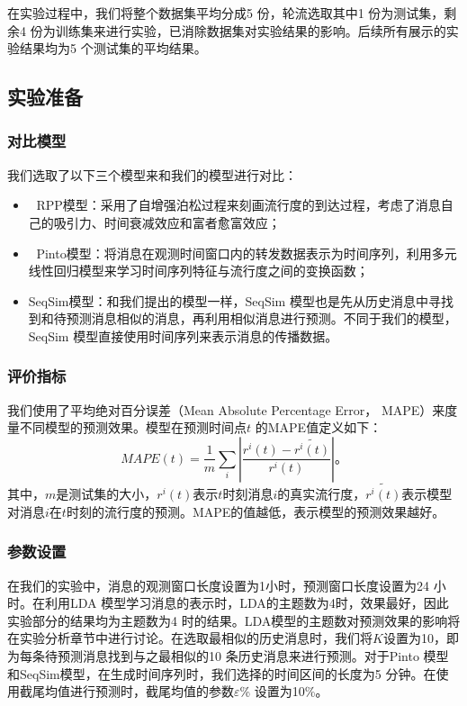 在实验过程中，我们将整个数据集平均分成5 份，轮流选取其中1 份为测试集，剩余4 份为训练集来进行实验，已消除数据集对实验结果的影响。后续所有展示的实验结果均为5 个测试集的平均结果。
\subsection{实验准备}
\subsubsection{对比模型}
我们选取了以下三个模型来和我们的模型进行对比：
\begin{itemize}
\item 	RPP模型\citep{shen2014modeling}：采用了自增强泊松过程来刻画流行度的到达过程，考虑了消息自己的吸引力、时间衰减效应和富者愈富效应；
\item 	Pinto模型\citep{pinto2013using}：将消息在观测时间窗口内的转发数据表示为时间序列，利用多元线性回归模型来学习时间序列特征与流行度之间的变换函数；
\item SeqSim模型：和我们提出的模型一样，SeqSim 模型也是先从历史消息中寻找到和待预测消息相似的消息，再利用相似消息进行预测。不同于我们的模型，SeqSim 模型直接使用时间序列来表示消息的传播数据。
\end{itemize}
\subsubsection{评价指标}
我们使用了平均绝对百分误差（Mean Absolute Percentage Error， MAPE）来度量不同模型的预测效果。模型在预测时间点$t$ 的MAPE值定义如下：
 \begin{displaymath}
 MAPE(t)=\frac{1}{m}\sum_{i} |\frac{r^i (t)-\widetilde{r^i (t)}}{r^i (t)}|\text{。}
 \end{displaymath}
其中，$m$是测试集的大小，$r^i (t)$表示$t$时刻消息$i$的真实流行度，$\widetilde{r^i (t)}$表示模型对消息$i$在$t$时刻的流行度的预测。MAPE的值越低，表示模型的预测效果越好。
\subsubsection{参数设置}
在我们的实验中，消息的观测窗口长度设置为1小时，预测窗口长度设置为24 小时。在利用LDA 模型学习消息的表示时，LDA的主题数为4时，效果最好，因此实验部分的结果均为主题数为4 时的结果。LDA模型的主题数对预测效果的影响将在实验分析章节中进行讨论。在选取最相似的历史消息时，我们将$K$设置为10，即为每条待预测消息找到与之最相似的10 条历史消息来进行预测。对于Pinto 模型和SeqSim模型，在生成时间序列时，我们选择的时间区间的长度为5 分钟。在使用截尾均值进行预测时，截尾均值的参数$\varepsilon$\% 设置为10\%。
